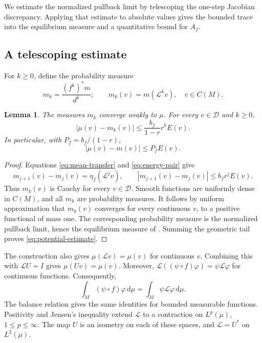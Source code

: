\documentclass[11pt,reqno]{amsart}
\theoremstyle{plain}
\newtheorem{lemma}[theorem]{Lemma}
\theoremstyle{definition}
\theoremstyle{remark}
\newcommand{\Lop}{\mathcal L}
\newcommand{\Dcal}{\mathcal D}
\newcommand{\dd}{\mathrm d}
\numberwithin{equation}{section}
\begin{document}
We estimate the normalized pullback limit by telescoping the one-step Jacobian discrepancy. Applying that estimate to absolute values gives the bounded trace into the equilibrium measure and a quantitative bound for $A_f$.

\subsection{A telescoping estimate}

For $k\ge0$, define the probability measure
\[
 m_k=\frac{(f^k)^*m}{d^k};
 \qquad m_k(v)=m(\Lop^kv),\quad v\in C(M).
\]

\begin{lemma}\label{lem:telescoping}
The measures $m_k$ converge weakly to $\mu$. For every $v\in\Dcal$ and $k\ge0$,
\begin{equation}\label{eq:potential-estimate}
 |\mu(v)-m_k(v)|\le\frac{b_f}{1-r}r^kE(v).
\end{equation}
In particular, with $P_f=b_f/(1-r)$,
\begin{equation}\label{eq:potential-zero}
 |\mu(v)-m(v)|\le P_fE(v).
\end{equation}
\end{lemma}

\begin{proof}
Equations \eqref{eq:mean-transfer} and \eqref{eq:energy-pair} give
\[
 m_{j+1}(v)-m_j(v)=\eta_f(\Lop^jv),
 \qquad |m_{j+1}(v)-m_j(v)|\le b_fr^jE(v).
\]
Thus $m_k(v)$ is Cauchy for every $v\in\Dcal$. Smooth functions are uniformly dense in $C(M)$, and all $m_k$ are probability measures. It follows by uniform approximation that $m_k(v)$ converges for every continuous $v$, to a positive functional of mass one. The corresponding probability measure is the normalized pullback limit, hence the equilibrium measure of \cite{OP14}. Summing the geometric tail proves \eqref{eq:potential-estimate}.
\end{proof}

The construction also gives $\mu(\Lop v)=\mu(v)$ for continuous $v$. Combining this with $\Lop U=I$ gives $\mu(Uv)=\mu(v)$. Moreover, $\Lop((\psi\circ f)\varphi)=\psi\Lop\varphi$ for continuous functions. Consequently,
\begin{equation}\label{eq:duality}
 \int_M(\psi\circ f)\varphi\,\dd\mu
 =\int_M\psi\Lop\varphi\,\dd\mu.
\end{equation}
The balance relation gives the same identities for bounded measurable functions. Positivity and Jensen's inequality extend $\Lop$ to a contraction on $L^p(\mu)$, $1\le p\le\infty$. The map $U$ is an isometry on each of these spaces, and $\Lop=U^*$ on $L^2(\mu)$.
\end{document}
